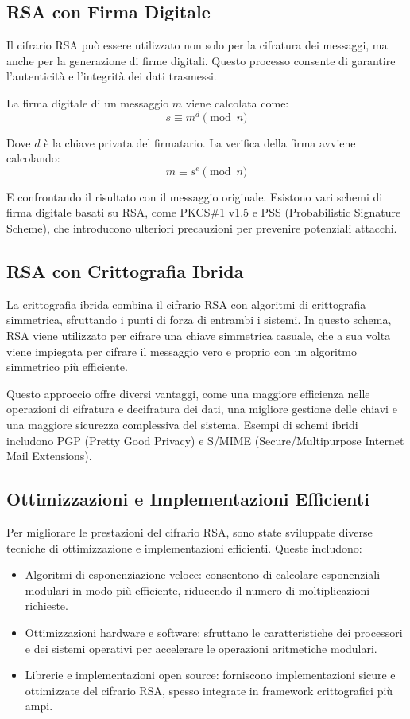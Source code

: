 \documentclass[a4paper,12pt]{report}
\begin{document}
\subsection{RSA con Firma Digitale}
Il cifrario RSA può essere utilizzato non solo per la cifratura dei messaggi, ma anche per la generazione di firme digitali. Questo processo consente di garantire l'autenticità e l'integrità dei dati trasmessi.

La firma digitale di un messaggio $m$ viene calcolata come:
\[s \equiv m^d \pmod{n}\]

Dove $d$ è la chiave privata del firmatario. La verifica della firma avviene calcolando:
\[m \equiv s^e \pmod{n}\]

E confrontando il risultato con il messaggio originale. Esistono vari schemi di firma digitale basati su RSA, come PKCS\#1 v1.5 e PSS (Probabilistic Signature Scheme), che introducono ulteriori precauzioni per prevenire potenziali attacchi.

\subsection{RSA con Crittografia Ibrida}
La crittografia ibrida combina il cifrario RSA con algoritmi di crittografia simmetrica, sfruttando i punti di forza di entrambi i sistemi. In questo schema, RSA viene utilizzato per cifrare una chiave simmetrica casuale, che a sua volta viene impiegata per cifrare il messaggio vero e proprio con un algoritmo simmetrico più efficiente.

\sloppy
Questo approccio offre diversi vantaggi, come una maggiore efficienza nelle operazioni di cifratura e decifratura dei dati, una migliore gestione delle chiavi e una maggiore sicurezza complessiva del sistema. 
Esempi di schemi ibridi includono PGP (Pretty Good Privacy) e S/MIME (Secure/Multipurpose Internet Mail Extensions).

\subsection{Ottimizzazioni e Implementazioni Efficienti}
Per migliorare le prestazioni del cifrario RSA, sono state sviluppate diverse tecniche di ottimizzazione e implementazioni efficienti. Queste includono:

\begin{itemize}
   \item Algoritmi di esponenziazione veloce: consentono di calcolare esponenziali modulari in modo più efficiente, riducendo il numero di moltiplicazioni richieste.
   \item Ottimizzazioni hardware e software: sfruttano le caratteristiche dei processori e dei sistemi operativi per accelerare le operazioni aritmetiche modulari.
   \item Librerie e implementazioni open source: forniscono implementazioni sicure e ottimizzate del cifrario RSA, spesso integrate in framework crittografici più ampi.
\end{itemize}
\end{document}
